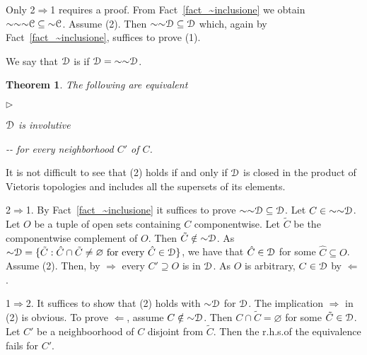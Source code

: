 \documentclass{amsproc}
\makeatletter
\newcommand{\mylabel}[1]{{#1}\hfill}
\renewenvironment{itemize}
  {\begin{list}{$\triangleright$}{%
  \setlength{\parskip}{0mm}
  \setlength{\topsep}{.1\baselineskip}
  \setlength{\rightmargin}{0mm}
  \setlength{\listparindent}{0mm}
  \setlength{\itemindent}{0mm}
  \setlength{\labelwidth}{3ex}
  \setlength{\itemsep}{.1\baselineskip}
  \setlength{\parsep}{.1\baselineskip}
  \setlength{\partopsep}{0mm}
  \setlength{\labelsep}{1ex}
  \setlength{\leftmargin}{\labelwidth+\labelsep}
  \let\makelabel\mylabel}}{%
\end{list}}
\newcounter{thm}
\theoremstyle{mio}
\newtheorem{theorem}[thm]{Theorem}\tcolorboxenvironment{theorem}{mythm}
\providecommand{\proofNameStyle}{\bfseries}
\renewenvironment{proof}[1][\proofname]{\par
  \pushQED{\qed}%
  \normalfont%
  \trivlist
  \item[\hskip\labelsep
        \proofNameStyle
    #1\@addpunct{.}]\ignorespaces
}{%
  \popQED\endtrivlist\@endpefalse
}
\renewcommand*{\emph}[1]{%
   \smash{\tikz[baseline]\node[rectangle, fill=teal!25, rounded corners, inner xsep=0.5ex, inner ysep=0.2ex, anchor=base, minimum height = 2.7ex]{\strut #1};}}
\makeatother
\begin{document}
\begin{proof}
  Only 2$\Rightarrow$1 requires a proof.
  From Fact~\ref{fact_~inclusione} we obtain ${\sim}{\sim}{\sim}{\EuScript C}\subseteq{\sim}{\EuScript C}$.
  Assume (2).
  Then ${\sim}{\sim}{\EuScript D}\subseteq{\EuScript D}$ which, again by Fact~\ref{fact_~inclusione}, suffices to prove (1).
\end{proof}

We say that ${\EuScript D}$ is \emph{involutive\/} if ${\EuScript D}={\sim}{\sim}{\EuScript D}$.

\begin{theorem}
  The following are equivalent
  \begin{itemize}
    \item [1.] ${\EuScript D}$ is involutive 
    \item [2.] \noindent\kern-\kern-
     for every neighborhood $C'$ of $C$.
  \end{itemize}
\end{theorem}

It is not difficult to see that (2) holds if and only if ${\EuScript D}$ is closed in the product of Vietoris topologies and includes all the supersets of its elements.

\begin{proof}
  2$\Rightarrow$1.
  By Fact~\ref{fact_~inclusione} it suffices to prove ${\sim}{\sim}{\EuScript D}\subseteq{\EuScript D}$.
  Let $C\in{\sim}{\sim}{\EuScript D}$.
  Let $O$ be a tuple of open sets containing $C$ componentwise.
  Let $\tilde C$ be the componentwise complement of $O$.  
  Then $\tilde C\notin{\sim}{\EuScript D}$.
  As ${\sim}{\EuScript D}=\{\tilde C:  \hat C\cap\tilde C\neq\varnothing\text{ for every }\hat C\in{\EuScript D}\}$, we have that $\hat C\in{\EuScript D}$ for some $\hat C\subseteq O$.
  Assume (2).
  Then, by $\Rightarrow$ every $C'\supseteq O$ is in ${\EuScript D}$.
  As $O$ is arbitrary, $C\in {\EuScript D}$ by $\Leftarrow$.

  1$\Rightarrow$2.
  It suffices to show that (2) holds with ${\sim}{\EuScript D}$ for ${\EuScript D}$.
  The implication $\Rightarrow$ in (2) is obvious.
  To prove $\Leftarrow$, assume $C\notin{\sim}{\EuScript D}$.
  Then $C\cap\tilde C=\varnothing$ for some $\tilde C\in{\EuScript D}$.
  Let $C'$ be a neighboorhood of $C$ disjoint from $\tilde C$.
  Then the r.h.s.\@ of the equivalence fails for $C'$.  
\end{proof}
\end{document}
